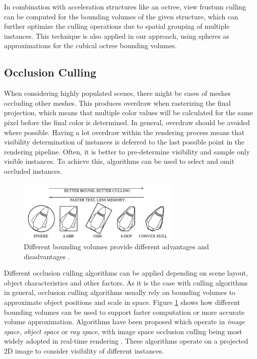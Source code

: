 \vspace{0.5cm}
\noindent
In combination with acceleration structures like an octree, view frustum culling can be computed for the bounding 
volumes of the given structure, which can further optimize the culling operations due to spatial grouping of multiple 
instances. This technique is also applied in our approach, using spheres as approximations for the cubical octree 
bounding volumes.

\subsection{Occlusion Culling} \label{subsec-point-based-occlusion-culling}

When considering highly populated scenes, there might be cases of meshes occluding other meshes. This produces overdraw 
when rasterizing the final projection, which means that multiple color values will be calculated for the same pixel 
before the final color is determined. In general, overdraw should be avoided where possible. Having a lot overdraw 
within the rendering process means that visibility determination of instances is deferred to the last possible point in 
the rendering pipeline. Often, it is better to pre-determine visibility and sample only visible instances. To achieve 
this, algorithms can be used to select and omit occluded instances. \\

\begin{figure}[h]
    \centering
    \includegraphics[width=300px]{images/graphics/bounding-volume-quality.png}
    \caption{Different bounding volumes provide different advantages and disadvantages \cite{Six2021}.}
    \label{fig:bounding-volumes}
\end{figure}

\noindent
Different occlusion culling algorithms can be applied depending on scene layout, object characteristics and other factors.
As it is the case with culling algorithms in general, occlusion culling algorithms usually rely on bounding volumes to 
approximate object positions and scale in space. Figure \ref{fig:bounding-volumes} shows how different bounding volumes 
can be used to support faster computation or more accurate volume approximation. Algorithms have been proposed which 
operate in \emph{image space}, \emph{object space} or \emph{ray space}, with image space occlusion culling being most 
widely adopted in real-time rendering \cite{AkenineMoeller2018}. These algorithms operate on a projected 2D image to 
consider visibility of different instances.  

